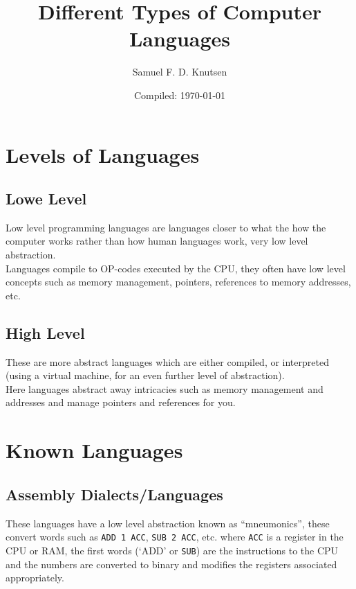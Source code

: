 \documentclass{article}
\newcommand{\code}[1]{\texttt{#1}}
\begin{document}
\title{Different Types of Computer Languages}
\author{Samuel F. D. Knutsen}
\date{Compiled: \today}
\maketitle

\tableofcontents
\clearpage

\section[Languages types]{Levels of Languages}
\subsection{Lowe Level}
Low level programming languages are languages closer to what the how the computer works rather than how human languages work, very low level abstraction.\\

Languages compile to OP-codes executed by the CPU, they often have low level concepts such as memory management, pointers, references to memory addresses, etc.

\subsection{High Level}
These are more abstract languages which are either compiled, or interpreted (using a virtual machine, for an even further level of abstraction).\\

Here languages abstract away intricacies such as memory management and addresses and manage pointers and references for you. 

\section{Known Languages}
\subsection[ASM]{Assembly Dialects/Languages}
These languages have a low level abstraction known as ``mneumonics'',
these convert words such as \code{ADD 1 ACC}, \code{SUB 2 ACC}, etc. where \code{ACC} is a register in the CPU or RAM, the first words (`ADD' or \code{SUB}) are the instructions to the CPU and the numbers are converted to binary and modifies the registers associated appropriately. \\
\end{document}
